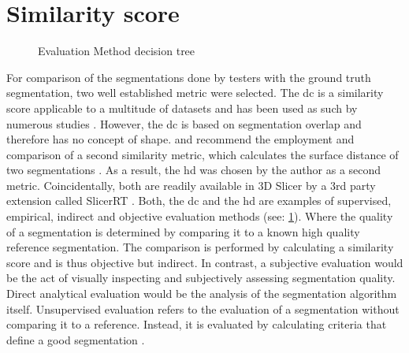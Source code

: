 \section{Similarity score}\label{s:similarity-score}
\begin{figure}[h!]
	
	\caption{Evaluation Method decision tree \cite{wangImageSegmentationEvaluation2020}}\label{fig:eval}
\end{figure}
\noindent
For comparison of the segmentations done by testers with the ground truth segmentation, two well established metric were selected.
The \acrfull{dc} is a similarity score applicable to a multitude of datasets and has been used as such by numerous studies \cite{setiawanImageSegmentationMetrics2020,atasPerformanceEvaluationJaccardDice2023}.
However, the \acrshort{dc} is based on segmentation overlap and therefore has no concept of shape.
 and \citeauthor{wangImageSegmentationEvaluation2020} recommend the employment and comparison of a second similarity metric, which calculates the surface distance of two segmentations \cite{aspertMESHMeasuringErrors2002,simBrainVentricleDetection2016}.
As a result, the \acrfull{hd} was chosen by the author as a second metric.
Coincidentally, both are readily available in 3D Slicer by a 3rd party extension called SlicerRT \cite{pinterSlicerRTRadiationTherapy2012}.
Both, the \acrlong{dc} and the \acrlong{hd} are examples of supervised, empirical, indirect and objective evaluation methods (see: \cref{fig:eval}).
Where the quality of a segmentation is determined by comparing it to a known high quality reference segmentation.
The comparison is performed by calculating a similarity score and is thus objective but indirect.
In contrast, a subjective evaluation would be the act of visually inspecting and subjectively assessing segmentation quality.
Direct analytical evaluation would be the analysis of the segmentation algorithm itself.
Unsupervised evaluation refers to the evaluation of a segmentation without comparing it to a reference.
Instead, it is evaluated by calculating criteria that define a good segmentation \cite{wangImageSegmentationEvaluation2020}.


